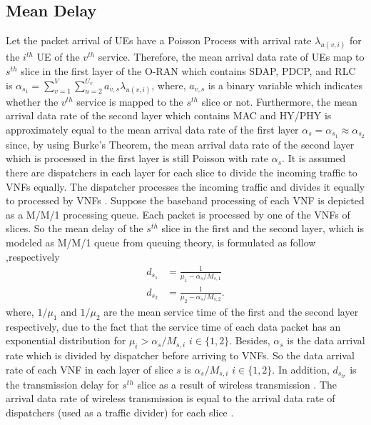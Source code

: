 \documentclass[conference]{IEEEtran}
\begin{document}
\subsection{Mean Delay}
Let the packet arrival of UEs have a Poisson Process with arrival rate $\lambda_{u(v,i)}$ for the $i^{th}$ UE of the $v^{th}$ service.
Therefore, the mean arrival data rate of UEs map to $s^{th}$ slice in the first layer of the O-RAN which contains SDAP, PDCP, and RLC is
$\alpha_{s_1} = \sum_{v=1}^{V}\sum_{u=2}^{U_v}a_{v,s}\lambda_{u(v,i)}$, where, $a_{v,s}$ is a binary variable which indicates whether the $v^{th}$ service is mapped to the $s^{th}$ slice or not.
Furthermore, the mean arrival data rate of the second layer which contains MAC and HY/PHY is approximately equal to the mean arrival data rate of the first layer $\alpha_{s} =\alpha_{s_1} \approx \alpha_{s_2}$ since, by using Burke’s Theorem, the mean arrival data rate of the second layer which is processed in the first layer is still Poisson with rate $\alpha_{s}$.
It is assumed there are dispatchers in each layer for each slice to divide the incoming traffic to VNFs equally. The dispatcher processes the incoming traffic and divides it equally to processed by VNFs  \cite{frdl,luong2018novel,luong2018novel1}.
Suppose the baseband processing of each VNF is depicted as a M/M/1 processing queue.
Each packet is processed by one of the VNFs of slices. So the mean delay of the $s^{th}$ slice in the first and the second layer, which is modeled as M/M/1 queue from queuing theory, is formulated as follow
,respectively
\begin{equation}
\begin{split}
d_{s_1} &= \frac{1}{\mu_1 - \alpha_{s}/{M_{s,1}}} \\
d_{s_2} &= \frac{1}{\mu_2 - \alpha_{s}/{M_{s,2}}}.
\end{split}
\end{equation}
where, $1/\mu_1$ and $1/\mu_2$ are the mean service time of the first and the second layer respectively, due to the fact that the service time of each data packet has an exponential distribution for $\mu_i>\alpha_{s}/{M_{s,i}}$ $ i \in \{1,2\}$. Besides, $\alpha_{s}$ is the data arrival rate which is divided
by dispatcher before arriving to VNFs. So the data arrival rate of each VNF in each layer of slice $s$ is $\alpha_{s}/{M_{s,i}}$ $ i \in \{1,2\}$.
In addition, $d_{s_{tr}}$ is the transmission delay for $s^{th}$ slice as a result of wireless transmission . The arrival data rate of wireless transmission
 is equal to the arrival data rate of dispatchers (used as a traffic divider) for each slice \cite{frdl}.
\end{document}
